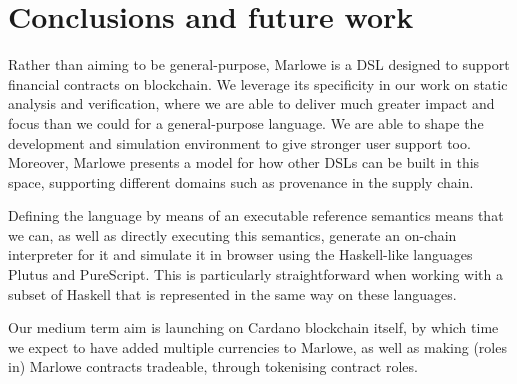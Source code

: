 \documentclass[runningheads]{llncs}
\begin{document}
\section{Conclusions and future work}

Rather than aiming to be general-purpose, Marlowe is a DSL designed to support financial contracts on blockchain. We leverage its specificity in our work on static analysis and verification, where we are able to deliver much greater impact and focus than we could for a general-purpose language. We are able to shape the development and simulation environment to give stronger user support too. Moreover, Marlowe  presents a model for how other DSLs can be built in this space, supporting different domains such as provenance in the supply chain. 

Defining the language by means of an executable reference semantics means that we can, as well as directly executing this semantics, generate an on-chain interpreter for it and simulate it in browser using the Haskell-like languages Plutus and PureScript. This is particularly straightforward when working with a subset of Haskell that is represented in the same way on these languages.

Our medium term aim is launching on Cardano blockchain itself, by which time we expect to have added multiple currencies to Marlowe, as well as making (roles in) Marlowe contracts tradeable, through tokenising contract roles.


%
%
%


%
\end{document}
